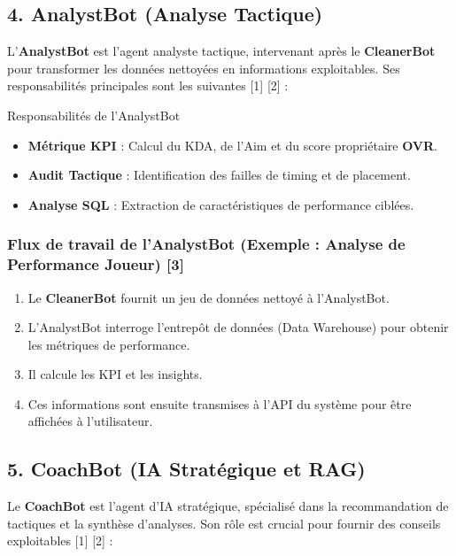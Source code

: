\documentclass[11pt,a4paper]{article}
\begin{document}
\subsection{4. AnalystBot (Analyse Tactique)}

L'\textbf{AnalystBot} est l'agent analyste tactique, intervenant après le \textbf{CleanerBot} pour transformer les données nettoyées en informations exploitables. Ses responsabilités principales sont les suivantes [1] [2] :

\begin{WorkflowStep}{Responsabilités de l'AnalystBot}
\begin{itemize}[label=\color{valorantRed}\faCogs, itemsep=6pt]
    \item \textbf{Métrique KPI} : Calcul du KDA, de l'Aim et du score propriétaire \textbf{OVR}.
    \item \textbf{Audit Tactique} : Identification des failles de timing et de placement.
    \item \textbf{Analyse SQL} : Extraction de caractéristiques de performance ciblées.
\end{itemize}
\end{WorkflowStep}

\subsubsection*{Flux de travail de l'AnalystBot (Exemple : Analyse de Performance Joueur) [3]}
\begin{enumerate}
    \item Le \textbf{CleanerBot} fournit un jeu de données nettoyé à l'AnalystBot.
    \item L'AnalystBot interroge l'entrepôt de données (Data Warehouse) pour obtenir les métriques de performance.
    \item Il calcule les KPI et les insights.
    \item Ces informations sont ensuite transmises à l'API du système pour être affichées à l'utilisateur.
\end{enumerate}

\subsection{5. CoachBot (IA Stratégique et RAG)}

Le \textbf{CoachBot} est l'agent d'IA stratégique, spécialisé dans la recommandation de tactiques et la synthèse d'analyses. Son rôle est crucial pour fournir des conseils exploitables [1] [2] :
\end{document}
